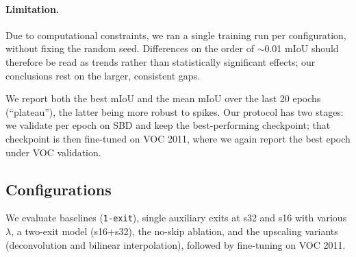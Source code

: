 \documentclass[runningheads]{llncs}
\begin{document}
    \paragraph{Limitation.}
    Due to computational constraints, we ran a single training run per configuration,
    without fixing the random seed. Differences on the order of $\sim$0.01 mIoU should
    therefore be read as trends rather than statistically significant effects; our
    conclusions rest on the larger, consistent gaps.
    
    We report both the best mIoU and the mean mIoU over the last 20 epochs
    (``plateau''), the latter being more robust to spikes. Our protocol has two
    stages: we validate per epoch on SBD and keep the best-performing checkpoint;
    that checkpoint is then fine-tuned on VOC 2011, where we again report the best
    epoch under VOC validation.

    \subsection{Configurations}
    We evaluate baselines (\texttt{1-exit}), single auxiliary exits at s32 and s16
    with various $\lambda$, a two-exit model (s16+s32), the no-skip ablation, and
    the upscaling variants (deconvolution and bilinear interpolation), followed by
    fine-tuning on VOC 2011.

    
    
    
    
    
    
\end{document}
